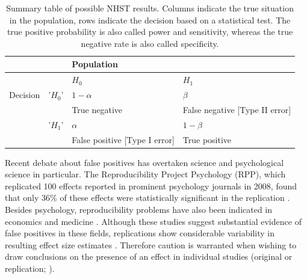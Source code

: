 \documentclass{article}
\begin{document}
\begin{table}[htbp]
\caption{Summary table of possible NHST results. Columns indicate the true situation in the population, rows indicate the decision based on a statistical test. The true positive probability is also called power and sensitivity, whereas the true negative rate is also called specificity.}
\begin{adjustbox}{width=\textwidth,totalheight=\textheight,keepaspectratio,angle=0}
\centering
\begin{tabular}{llll}
&    & Population                        &                                    \\ \hline
&    & $H_0$                                & $H_1$                                 \\
Decision & '$H_0$' & $1-\alpha$                           & $\beta$                               \\
&    & True negative                     & False negative {[}Type II error{]} \\
& '$H_1$' & $\alpha$                             & $1-\beta$                             \\
&    & False positive {[}Type I error{]} & True positive                   \\  \hline
\end{tabular}
\end{adjustbox}
\label{tab:tab1}
\end{table}

Recent debate about false positives has overtaken science and psychological science in particular. The Reproducibility Project Psychology (RPP), which replicated 100 effects reported in prominent psychology journals in 2008, found that only 36\% of these effects were statistically significant in the replication \cite{Open_Science_Collaboration2015-zs}. Besides psychology, reproducibility problems have also been indicated in economics \cite{Camerer2016-zz} and medicine \cite{Begley2012-uc}. Although these studies suggest substantial evidence of false positives in these fields, replications show considerable variability in resulting effect size estimates \cite{Klein2014-jb, Stanley2014-pd}. Therefore caution is warranted when wishing to draw conclusions on the presence of an effect in individual studies (original or replication; \cite{Open_Science_Collaboration2015-zs,Gilbert2016-mi,Anderson2016-bv}).
\end{document}

